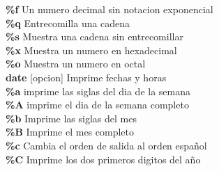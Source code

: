 \documentclass[11pt]{article}
\begin{document}
\hspace{2cm}\textbf{\%f}\hspace{2cm} Un numero decimal sin notacion exponencial\\

\hspace{2cm}\textbf{\%q}\hspace{2cm} Entrecomilla una cadena\\

\textbf{\%s}
\hspace{2cm} Muestra una cadena sin entrecomillar\\

\hspace{2cm}\textbf{\%x}
\hspace{2cm} Muestra un numero en hexadecimal\\

\hspace{2cm}\textbf{\%o} \hspace{2cm} Muestra un numero en octal \\




\textbf{date} [opcion] \hspace{2cm} Imprime fechas y horas\\

\hspace{2cm} \textbf{\%a}\hspace{2cm} imprime las siglas del dia de la semana\\

\hspace{2cm} \textbf{\%A} \hspace{2cm} imprime el dia de la semana completo\\

\hspace{2cm} \textbf{\%b} \hspace{2cm} Imprime las siglas del mes \\

\hspace{2cm} \textbf{\%B} \hspace{2cm} Imprime el mes completo\\

\hspace{2cm} \textbf{\%c}
\hspace{2cm} Cambia el orden de salida al orden español\\

\hspace{2cm} \textbf{\%C}
\hspace{2cm} Imprime los dos primeros digitos del año\\
\end{document}
